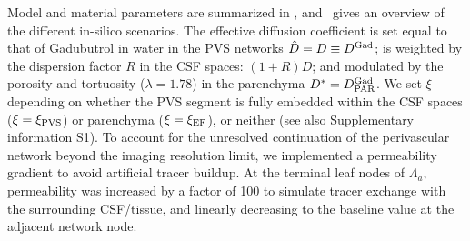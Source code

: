 \documentclass[fleqn,10pt]{wlscirep}
\begin{document}
Model and material parameters are summarized in ,
and~ gives an overview of the different in-silico
scenarios.
%
%
The effective diffusion coefficient is set equal to that of Gadubutrol
in water in the PVS networks $\hat{D} = D \equiv D^{\rm Gad}$; is 
weighted by the dispersion factor $R$ in the CSF spaces: $(1 + R) D$;
and modulated by the porosity and tortuosity ($\lambda = 1.78$) in the
parenchyma $D^{\ast} = D^{\rm Gad}_{\rm PAR}$. We set $\xi$ depending
on whether the PVS segment is fully embedded within the CSF spaces
($\xi = \xi_{\rm PVS}$) or parenchyma ($\xi = \xi_{\rm EF}$), or
neither (see also Supplementary information S1). To account for the
unresolved continuation of the perivascular network beyond the imaging
resolution limit, we implemented a permeability gradient to avoid
artificial tracer buildup. At the terminal leaf nodes of $\Lambda_a$,
permeability was increased by a factor of 100 to simulate tracer
exchange with the surrounding CSF/tissue, and linearly decreasing to
the baseline value at the adjacent network node.
\end{document}
